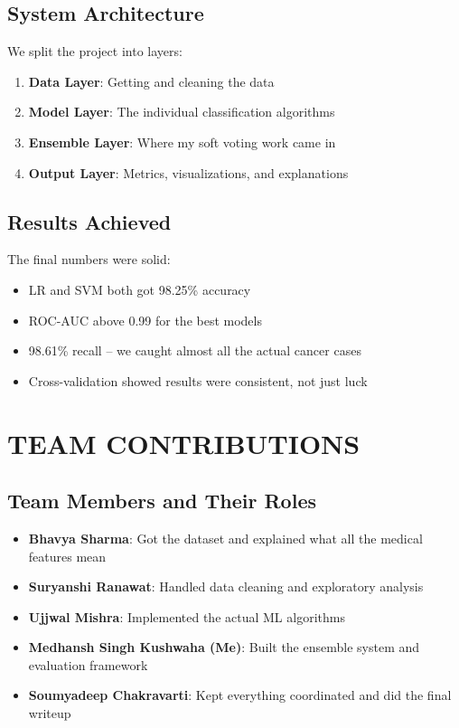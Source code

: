 \documentclass[12pt]{article}
\begin{document}
\subsection{System Architecture}
We split the project into layers:
\begin{enumerate}
    \item \textbf{Data Layer}: Getting and cleaning the data
    \item \textbf{Model Layer}: The individual classification algorithms
    \item \textbf{Ensemble Layer}: Where my soft voting work came in
    \item \textbf{Output Layer}: Metrics, visualizations, and explanations
\end{enumerate}

\subsection{Results Achieved}
The final numbers were solid:
\begin{itemize}
    \item LR and SVM both got 98.25\% accuracy
    \item ROC-AUC above 0.99 for the best models
    \item 98.61\% recall -- we caught almost all the actual cancer cases
    \item Cross-validation showed results were consistent, not just luck
\end{itemize}

\newpage
\section{TEAM CONTRIBUTIONS}

\subsection{Team Members and Their Roles}

\begin{itemize}
    \item \textbf{Bhavya Sharma}: Got the dataset and explained what all the medical features mean
    \item \textbf{Suryanshi Ranawat}: Handled data cleaning and exploratory analysis
    \item \textbf{Ujjwal Mishra}: Implemented the actual ML algorithms
    \item \textbf{Medhansh Singh Kushwaha (Me)}: Built the ensemble system and evaluation framework
    \item \textbf{Soumyadeep Chakravarti}: Kept everything coordinated and did the final writeup
\end{itemize}
\end{document}
